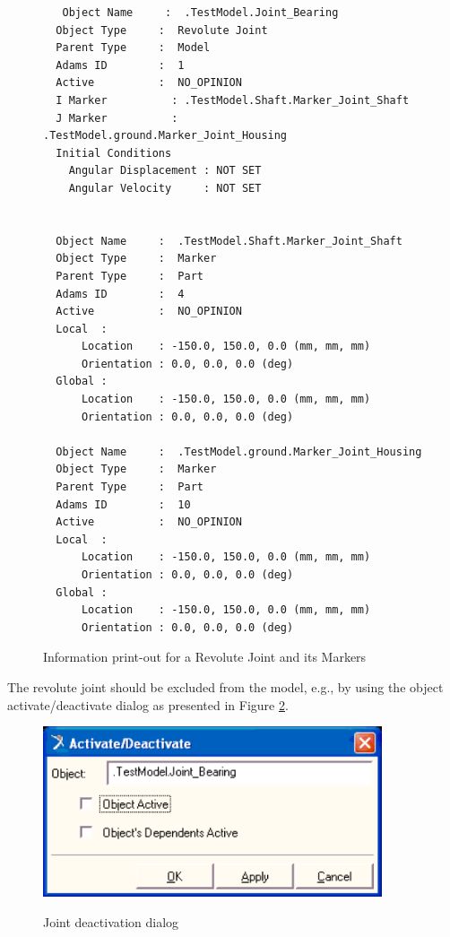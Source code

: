 \begin{figure}[h]
\small{
\begin{verbatim}
   Object Name     :  .TestModel.Joint_Bearing
  Object Type     :  Revolute Joint
  Parent Type     :  Model
  Adams ID        :  1
  Active          :  NO_OPINION
  I Marker          : .TestModel.Shaft.Marker_Joint_Shaft
  J Marker          : .TestModel.ground.Marker_Joint_Housing
  Initial Conditions
    Angular Displacement : NOT SET
    Angular Velocity     : NOT SET


  Object Name     :  .TestModel.Shaft.Marker_Joint_Shaft
  Object Type     :  Marker
  Parent Type     :  Part
  Adams ID        :  4
  Active          :  NO_OPINION
  Local  :
      Location    : -150.0, 150.0, 0.0 (mm, mm, mm)
      Orientation : 0.0, 0.0, 0.0 (deg)
  Global :
      Location    : -150.0, 150.0, 0.0 (mm, mm, mm)
      Orientation : 0.0, 0.0, 0.0 (deg)

  Object Name     :  .TestModel.ground.Marker_Joint_Housing
  Object Type     :  Marker
  Parent Type     :  Part
  Adams ID        :  10
  Active          :  NO_OPINION
  Local  :
      Location    : -150.0, 150.0, 0.0 (mm, mm, mm)
      Orientation : 0.0, 0.0, 0.0 (deg)
  Global :
      Location    : -150.0, 150.0, 0.0 (mm, mm, mm)
      Orientation : 0.0, 0.0, 0.0 (deg)
\end{verbatim}
}
\caption{Information print-out for a Revolute Joint and its Markers \label{figRevJnt}}
\end{figure}

The revolute joint should be excluded from the model,
e.g., by using the object activate/deactivate dialog
as presented in Figure \ref{figJointDeact}.
\begin{figure}[h]
\begin{center}
   {\includegraphics[width=10cm]{figs/JointDeact.png}}
\end{center}
\caption{Joint deactivation dialog \label{figJointDeact}}
\end{figure}

